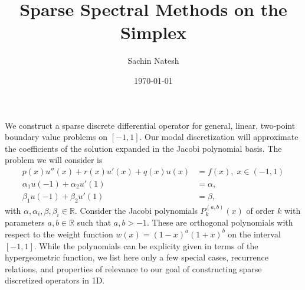  


\newcommand{\bs}{\boldsymbol}
\renewcommand{\st}{\text{ s.t. }}
\newcommand{\eps}{\varepsilon}
\newcommand{\s}{\;}
\newcommand{\sif}{\text{ if }}
\newcommand{\pfrac}{\displaystyle \frac}
\newcommand{\Tau}{\mathcal{T}}
\newcommand{\Tref}{\mathcal{T}_{\text{ref}}}
\newcommand{\Qref}{\mathcal{Q}_{\text{ref}}}
\newcommand{\bb}[1]{\mathbb{#1}}

\newtheorem{theorem}{Theorem}[section]
\newtheorem{corollary}{Corollary}[theorem]
\newtheorem{lemma}{Lemma}[section]
\newtheorem{definition}{Definition}[section]
\newtheorem{proposition}{Proposition}[section]
\newtheorem{corollaryprop}{Corollary}[proposition]

\title{Sparse Spectral Methods on the Simplex}
\author{Sachin Natesh}
\date{\today}



	\setcounter{secnumdepth}{5}
	\setcounter{tocdepth}{4}
\maketitle
\tableofcontents
\newpage


We construct a sparse discrete differential operator for general, linear, two-point boundary value problems on $[-1,1]$. Our modal discretization will approximate the coefficients of the solution expanded in the Jacobi polynomial basis. The problem we will consider is
\begin{align}\label{eq:prob}
p(x)u''(x) + r(x)u'(x) + q(x)u(x) &= f(x),\s x \in (-1,1)\\
\alpha_1u(-1) + \alpha_2u'(1) &=\alpha,\label{eq:probbc0}\\ \beta_1u(-1)+\beta_2u'(1) &= \beta,\label{eq:probbc}
\end{align}
with $\alpha,\alpha_i,\beta,\beta_i\in \bb{R}.$
Consider the Jacobi polynomials $P_k^{(a,b)}(x)$ of order $k$ with parameters $a,b \in \bb{R}$ such that $a,b> -1$. These are orthogonal polynomials with respect to the weight function $w(x)=(1-x)^a(1+x)^b$ on the interval $[-1,1]$. While the polynomials can be explicity given in terms of the hypergeometric function, we list here only a few special cases, recurrence relations, and properties of relevance to our goal of constructing sparse discretized operators in 1D. 

